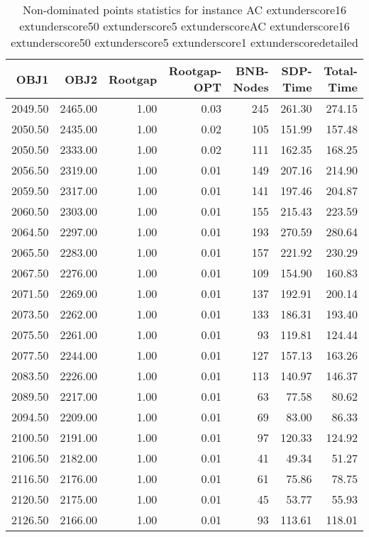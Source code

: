 \begin{table}
\caption{Non-dominated points statistics for instance AC	extunderscore16	extunderscore50	extunderscore5	extunderscoreAC	extunderscore16	extunderscore50	extunderscore5	extunderscore1	extunderscoredetailed}
\label{tab:stats/AC_16_50_5_AC_16_50_5_1_detailed}
\begin{tabular}{rrrrrrr}
\toprule
OBJ1 & OBJ2 & Rootgap & Rootgap-OPT & BNB-Nodes & SDP-Time & Total-Time \\
\midrule
2049.50 & 2465.00 & 1.00 & 0.03 & 245 & 261.30 & 274.15 \\
2050.50 & 2435.00 & 1.00 & 0.02 & 105 & 151.99 & 157.48 \\
2050.50 & 2333.00 & 1.00 & 0.02 & 111 & 162.35 & 168.25 \\
2056.50 & 2319.00 & 1.00 & 0.01 & 149 & 207.16 & 214.90 \\
2059.50 & 2317.00 & 1.00 & 0.01 & 141 & 197.46 & 204.87 \\
2060.50 & 2303.00 & 1.00 & 0.01 & 155 & 215.43 & 223.59 \\
2064.50 & 2297.00 & 1.00 & 0.01 & 193 & 270.59 & 280.64 \\
2065.50 & 2283.00 & 1.00 & 0.01 & 157 & 221.92 & 230.29 \\
2067.50 & 2276.00 & 1.00 & 0.01 & 109 & 154.90 & 160.83 \\
2071.50 & 2269.00 & 1.00 & 0.01 & 137 & 192.91 & 200.14 \\
2073.50 & 2262.00 & 1.00 & 0.01 & 133 & 186.31 & 193.40 \\
2075.50 & 2261.00 & 1.00 & 0.01 & 93 & 119.81 & 124.44 \\
2077.50 & 2244.00 & 1.00 & 0.01 & 127 & 157.13 & 163.26 \\
2083.50 & 2226.00 & 1.00 & 0.01 & 113 & 140.97 & 146.37 \\
2089.50 & 2217.00 & 1.00 & 0.01 & 63 & 77.58 & 80.62 \\
2094.50 & 2209.00 & 1.00 & 0.01 & 69 & 83.00 & 86.33 \\
2100.50 & 2191.00 & 1.00 & 0.01 & 97 & 120.33 & 124.92 \\
2106.50 & 2182.00 & 1.00 & 0.01 & 41 & 49.34 & 51.27 \\
2116.50 & 2176.00 & 1.00 & 0.01 & 61 & 75.86 & 78.75 \\
2120.50 & 2175.00 & 1.00 & 0.01 & 45 & 53.77 & 55.93 \\
2126.50 & 2166.00 & 1.00 & 0.01 & 93 & 113.61 & 118.01 \\
\bottomrule
\end{tabular}
\end{table}
